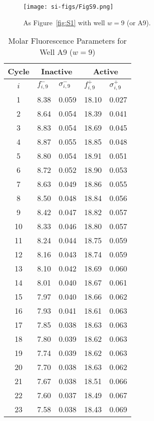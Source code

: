                 \begin{figure}
                    \centering
                    \texttt{[image: si-figs/FigS9.png]}
                    \caption{
                        As Figure~\ref{fig:S1} with well $w=9$ (or A9).
                    }
                \end{figure}
                \clearpage
    \begin{table}
        \caption{Molar Fluorescence Parameters for Well A9 ($w=9$)}
        \centering
        \begin{tabular}{c|ll|ll}
            Cycle & \multicolumn{2}{c|}{Inactive} & \multicolumn{2}{c}{Active} \\
            \hline
            $i$ & $f_{i,9}^{-}$ & $\sigma_{i,9}^{-}$ &  $f_{i,9}^{+}$ & $\sigma_{i,9}^{+}$ \\
            \hline
    1 & 8.38 & 0.059 & 18.10 & 0.027 \\
2 & 8.64 & 0.054 & 18.39 & 0.041 \\
3 & 8.83 & 0.054 & 18.69 & 0.045 \\
4 & 8.87 & 0.055 & 18.85 & 0.048 \\
5 & 8.80 & 0.054 & 18.91 & 0.051 \\
6 & 8.72 & 0.052 & 18.90 & 0.053 \\
7 & 8.63 & 0.049 & 18.86 & 0.055 \\
8 & 8.50 & 0.048 & 18.84 & 0.056 \\
9 & 8.42 & 0.047 & 18.82 & 0.057 \\
10 & 8.33 & 0.046 & 18.80 & 0.057 \\
11 & 8.24 & 0.044 & 18.75 & 0.059 \\
12 & 8.16 & 0.043 & 18.74 & 0.059 \\
13 & 8.10 & 0.042 & 18.69 & 0.060 \\
14 & 8.01 & 0.040 & 18.67 & 0.061 \\
15 & 7.97 & 0.040 & 18.66 & 0.062 \\
16 & 7.93 & 0.041 & 18.61 & 0.063 \\
17 & 7.85 & 0.038 & 18.63 & 0.063 \\
18 & 7.80 & 0.039 & 18.62 & 0.063 \\
19 & 7.74 & 0.039 & 18.62 & 0.063 \\
20 & 7.70 & 0.038 & 18.63 & 0.062 \\
21 & 7.67 & 0.038 & 18.51 & 0.066 \\
22 & 7.60 & 0.037 & 18.49 & 0.067 \\
23 & 7.58 & 0.038 & 18.43 & 0.069 \\

\end{tabular}
\end{table}
